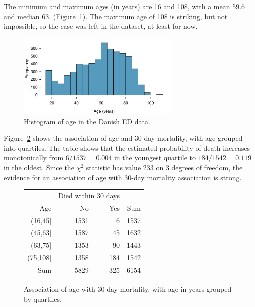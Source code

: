 The minimum and maximum ages (in years) are 16 and 108, with a mean 59.6 and median 63. (Figure~\ref{figure:histAgeDanishED}).  The maximum age of 108 is striking, but not impossible, so the case was left in the dataset, at least for now.

\begin{figure}[!tbh]
  \centering
  \includegraphics[width=0.70\textwidth]
  {ch_logistic_regression_oi_biostat/figures/histAgeDanishED/histAgeDanishED.pdf}
    \caption{Histogram of age in the Danish ED data.}
    \label{figure:histAgeDanishED}
\end{figure}

Figure~\ref{figure:mort30AgeTable} shows the association of age and 30 day mortality, with age grouped into quartiles. The table shows that the estimated probability of death increases monotonically from $6/1537 = 0.004$ in the youngest quartile to $184/1542 = 0.119$ in the oldest.  Since the $\chi^2$ statistic has value 233 on 3 degrees of freedom, the evidence for an association of age with 30-day mortality association is strong.

\begin{figure}[ht]
\centering
\begin{tabular}{rrrr}
  \hline
    & \multicolumn{2}{c}{Died within 30 days} & \\
Age & No & Yes & Sum \\
  \hline
(16,45] & 1531 & 6 & 1537 \\
  (45,63] & 1587 & 45 & 1632 \\
  (63,75] & 1353 & 90 & 1443 \\
  (75,108] & 1358 & 184 & 1542 \\
  Sum & 5829 & 325 & 6154 \\
   \hline
\end{tabular}
\caption{Association of age with
       30-day mortality, with age in years grouped by quartiles.}
\label{figure:mort30AgeTable}
\end{figure}

